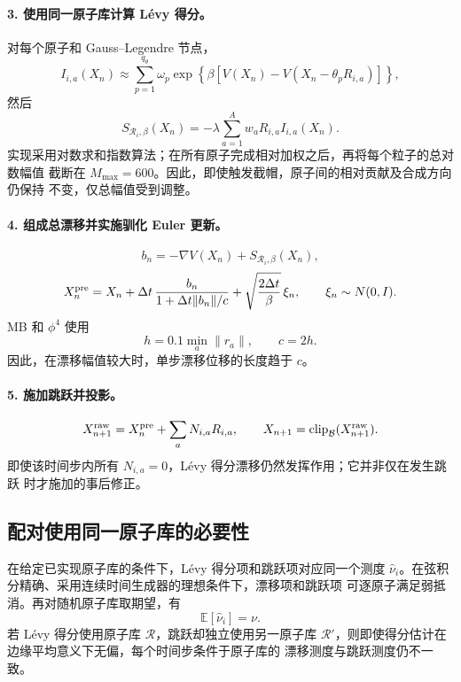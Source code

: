 \documentclass[11pt,a4paper]{article}
\newcommand{\E}{\mathbb{E}}
\begin{document}
\paragraph{3. 使用同一原子库计算 Lévy 得分。}
对每个原子和 Gauss--Legendre 节点，
\begin{equation}
 I_{i,a}(X_n)
 \approx
 \sum_{p=1}^{q_\theta}\omega_p
 \exp\!\left\{\beta\left[
 V(X_n)-V(X_n-\theta_pR_{i,a})
 \right]\right\},
\end{equation}
然后
\begin{equation}
 S_{\mathcal R_i,\beta}(X_n)
 =
 -\lambda\sum_{a=1}^{A}w_aR_{i,a}I_{i,a}(X_n).
\end{equation}
实现采用对数求和指数算法；在所有原子完成相对加权之后，再将每个粒子的总对数幅值
截断在 $M_{\max}=600$。因此，即使触发截帽，原子间的相对贡献及合成方向仍保持
不变，仅总幅值受到调整。

\paragraph{4. 组成总漂移并实施驯化 Euler 更新。}
\begin{equation}
 b_n=-\nabla V(X_n)+S_{\mathcal R_i,\beta}(X_n),
\end{equation}
\begin{equation}
 X_n^{\rm pre}
 =
 X_n+
 \Delta t\,\frac{b_n}{1+\Delta t\|b_n\|/c}
 +\sqrt{\frac{2\Delta t}{\beta}}\,\xi_n,
 \qquad \xi_n\sim N(0,I).
\end{equation}
MB 和 $\phi^4$ 使用
\begin{equation}
 h=0.1\min_a\|r_a\|,\qquad c=2h.
\end{equation}
因此，在漂移幅值较大时，单步漂移位移的长度趋于 $c$。

\paragraph{5. 施加跳跃并投影。}
\begin{equation}
 X_{n+1}^{\rm raw}
 =
 X_n^{\rm pre}+\sum_aN_{i,a}R_{i,a},
 \qquad
 X_{n+1}=\operatorname{clip}_{\mathcal B}(X_{n+1}^{\rm raw}).
\end{equation}
即使该时间步内所有 $N_{i,a}=0$，Lévy 得分漂移仍然发挥作用；它并非仅在发生跳跃
时才施加的事后修正。

\subsection{配对使用同一原子库的必要性}

在给定已实现原子库的条件下，Lévy 得分项和跳跃项对应同一个测度
$\widehat\nu_i$。在弦积分精确、采用连续时间生成器的理想条件下，漂移项和跳跃项
可逐原子满足弱抵消。再对随机原子库取期望，有
\begin{equation}
 \E[\widehat\nu_i]=\nu.
\end{equation}
若 Lévy 得分使用原子库 $\mathcal R$，跳跃却独立使用另一原子库
$\mathcal R'$，则即使得分估计在边缘平均意义下无偏，每个时间步条件于原子库的
漂移测度与跳跃测度仍不一致。
\end{document}
